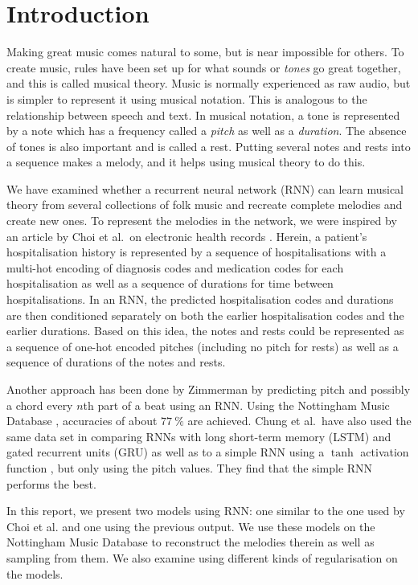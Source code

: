 \section{Introduction}
\label{sec:introduction}

Making great music comes natural to some, but is near impossible for others.
To create music, rules have been set up for what sounds or \emph{tones} go great together, and this is called musical theory.
Music is normally experienced as raw audio, but is simpler to represent it using musical notation.
This is analogous to the relationship between speech and text.
In musical notation, a tone is represented by a note which has a frequency called a \emph{pitch} as well as a \emph{duration}.
The absence of tones is also important and is called a rest.
Putting several notes and rests into a sequence makes a melody, and it helps using musical theory to do this.

We have examined whether a recurrent neural network (RNN) can learn musical theory from several collections of folk music and recreate complete melodies and create new ones.
To represent the melodies in the network, we were inspired by an article by Choi et al.\ on electronic health records \cite{Choi2015}. Herein, a patient's hospitalisation history is represented by a sequence of hospitalisations with a multi-hot encoding of diagnosis codes and medication codes for each hospitalisation as well as a sequence of durations for time between hospitalisations.
In an RNN, the predicted hospitalisation codes and durations are then conditioned separately on both the earlier hospitalisation codes and the earlier durations.
Based on this idea, the notes and rests could be represented as a sequence of one-hot encoded pitches (including no pitch for rests) as well as a sequence of durations of the notes and rests.

Another approach has been done by Zimmerman \cite{Zimmerman2016} by predicting pitch and possibly a chord every $n$th part of a beat using an RNN.
Using the Nottingham Music Database \cite{NMD}, accuracies of about $\SI{77}{\%}$ are achieved.
Chung et al.\ have also used the same data set in comparing RNNs with long short-term memory (LSTM) and gated recurrent units (GRU) as well as to a simple RNN using a $\tanh$ activation function \cite{Chung2014}, but only using the pitch values.
They find that the simple RNN performs the best.

In this report, we present two models using RNN: one similar to the one used by Choi et al. \cite{Choi2015} and one using the previous output.
We use these models on the Nottingham Music Database to reconstruct the melodies therein as well as sampling from them.
We also examine using different kinds of regularisation on the models.
